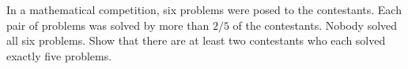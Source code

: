 In a mathematical competition, six problems were posed to the contestants. Each pair of problems was solved by more than $2/5$ of the contestants. Nobody solved all six problems. Show that there are at least two contestants who each solved exactly five problems.
